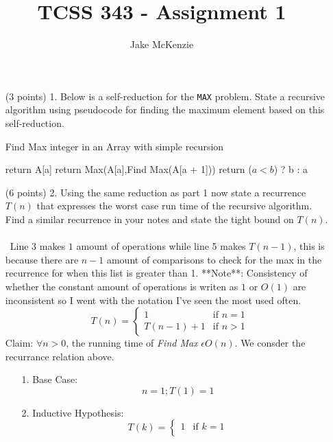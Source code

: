 \documentclass[paper=a4,fontsize=11pt]{article}
\begin{document}
\title{TCSS 343 - Assignment 1}
\author{Jake McKenzie}
\maketitle
\begin{enumerate}
\item [(3 points) 1.] Below is a self-reduction for the \texttt{MAX} problem. State a recursive algorithm using pseudocode for finding the maximum element based on this self-reduction.\\
\begin{algorithm}
\caption{Find Max integer in an Array with simple recursion}
\label{array-sum}
\begin{algorithmic}[1]
        \State return A[a]
        \State return Max(A[a],Find Max(A[a + 1]))
    \EndIf
\EndProcedure
{}
    return ($a < b$) ? b : a
\EndProcedure
\end{algorithmic}
\end{algorithm}
\item [(6 points) 2.] Using the same reduction as part 1 now state a recurrence $T(n)$ that expresses the worst case run time of the recursive algorithm. Find a similar recurrence in your notes and state the tight bound on $T(n)$.\\\\\
Line 3 makes $1$ amount of operations while line 5 makes $T(n-1)$, this is because there are $n-1$ amount of comparisons to check for the max in the recurrence for when this list is greater than 1. **Note**: Consistency of whether the constant amount of operations is writen as $1$ or $O(1)$ are inconsistent so I went with the notation I've seen the most used often.
\[
  T(n) =
    \begin{cases}
        1 & \text{if $n = 1$} \\
        T(n-1) + 1 & \text{if $n > 1$}
    \end{cases}
\]
Claim: $\forall n > 0$, the running time of \textit{Find Max} $\epsilon O(n)$. We consder the recurrance relation above.
\begin{enumerate}
\item[1.] Base Case:\\
$$n = 1; T(1) = 1$$
\item[2.] Inductive Hypothesis:\\
\[
  T(k) =
    \begin{cases}
        1 & \text{if $k = 1$} \\

\end{cases}\]
\end{enumerate}
\end{enumerate}
\end{document}
